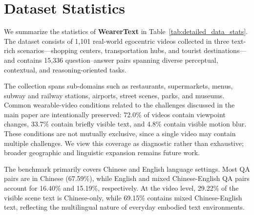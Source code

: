 \clearpage
\appendix


\section{Dataset Statistics}
\label{sec:dataset_statistics}

We summarize the statistics of \textbf{WearerText} in Table~\ref{tab:detailed_data_stats}. The dataset consists of 1,101 real-world egocentric videos collected in three text-rich scenarios---shopping centers, transportation hubs, and tourist destinations---and contains 15,336 question--answer pairs spanning diverse perceptual, contextual, and reasoning-oriented tasks. 

The collection spans sub-domains such as restaurants, supermarkets, menus, subway and railway stations, airports, street scenes, parks, and museums. Common wearable-video conditions related to the challenges discussed in the main paper are intentionally preserved: 72.0\% of videos contain viewpoint changes, 33.7\% contain briefly visible text, and 4.8\% contain visible motion blur. These conditions are not mutually exclusive, since a single video may contain multiple challenges. We view this coverage as diagnostic rather than exhaustive; broader geographic and linguistic expansion remains future work.

The benchmark primarily covers Chinese and English language settings. Most QA pairs are in Chinese (67.59\%), while English and mixed Chinese-English QA pairs account for 16.40\% and 15.19\%, respectively. At the video level, 29.22\% of the visible scene text is Chinese-only, while 69.15\% contains mixed Chinese-English text, reflecting the multilingual nature of everyday embodied text environments.


